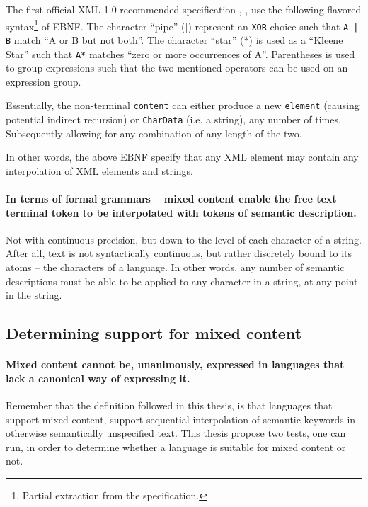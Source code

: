 \documentclass{scrreprt}
\begin{document}
The first official XML 1.0 recommended specification \citep{xmlFirstRecommendation}, \citeyear{xmlFirstRecommendation}, use the following flavored syntax\footnote{ Partial extraction from the specification.} of EBNF. The character ``pipe'' (|) represent an \texttt{XOR} choice such that \texttt{A | B} match ``A or B but not both''. The character ``star'' (*) is used as a ``Kleene Star'' such that \texttt{A*} matches ``zero or more occurrences of A''. Parentheses is used to group expressions such that the two mentioned operators can be used on an expression group.

Essentially, the non-terminal \texttt{content} can either produce a new \texttt{element} (causing potential indirect recursion) or \texttt{CharData} (i.e. a string), any number of times. Subsequently allowing for any combination of any length of the two.

In other words, the above EBNF specify that any XML element may contain any interpolation of XML elements and strings.

\paragraph{In terms of formal grammars -- mixed content enable the free text terminal token to be interpolated with tokens of semantic description.} Not with continuous precision, but down to the level of each character of a string. After all, text is not syntactically continuous, but rather discretely bound to its atoms -- the characters of a language. In other words, any number of semantic descriptions must be able to be applied to any character in a string, at any point in the string.



\subsection{Determining support for mixed content}
\paragraph{Mixed content cannot be, unanimously, expressed in languages that lack a canonical way of expressing it.} Remember that the definition followed in this thesis, is that languages that support mixed content, support sequential interpolation of semantic keywords in otherwise semantically unspecified text. This thesis propose two tests, one can run, in order to determine whether a language is suitable for mixed content or not.
\end{document}
